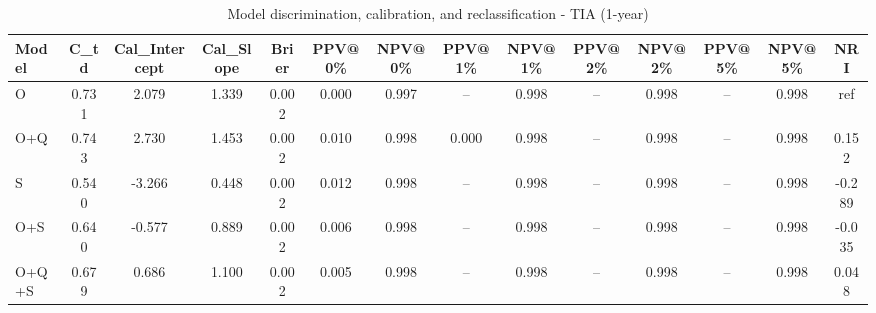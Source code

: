 \begin{table}[htbp]
\centering
\small
\caption{Model discrimination, calibration, and reclassification - TIA (1-year)}
\label{tab:perf_tia_1y}
\begin{tabular}{lccccccccccccc}
\toprule
Model & C\_td & Cal\_Intercept & Cal\_Slope & Brier & PPV@0\% & NPV@0\% & PPV@1\% & NPV@1\% & PPV@2\% & NPV@2\% & PPV@5\% & NPV@5\% & NRI \\
\midrule
O & 0.731 & 2.079 & 1.339 & 0.002 & 0.000 & 0.997 & -- & 0.998 & -- & 0.998 & -- & 0.998 & ref \\
O+Q & 0.743 & 2.730 & 1.453 & 0.002 & 0.010 & 0.998 & 0.000 & 0.998 & -- & 0.998 & -- & 0.998 & 0.152 \\
S & 0.540 & -3.266 & 0.448 & 0.002 & 0.012 & 0.998 & -- & 0.998 & -- & 0.998 & -- & 0.998 & -0.289 \\
O+S & 0.640 & -0.577 & 0.889 & 0.002 & 0.006 & 0.998 & -- & 0.998 & -- & 0.998 & -- & 0.998 & -0.035 \\
O+Q+S & 0.679 & 0.686 & 1.100 & 0.002 & 0.005 & 0.998 & -- & 0.998 & -- & 0.998 & -- & 0.998 & 0.048 \\
\bottomrule
\end{tabular}
\end{table}